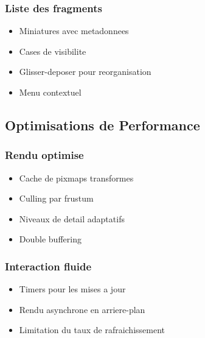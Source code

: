 \documentclass[12pt,a4paper]{article}
\begin{document}
\subsubsection{Liste des fragments}
\begin{itemize}
\item Miniatures avec metadonnees
\item Cases de visibilite
\item Glisser-deposer pour reorganisation
\item Menu contextuel
\end{itemize}

\subsection{Optimisations de Performance}

\subsubsection{Rendu optimise}
\begin{itemize}
\item Cache de pixmaps transformes
\item Culling par frustum
\item Niveaux de detail adaptatifs
\item Double buffering
\end{itemize}

\subsubsection{Interaction fluide}
\begin{itemize}
\item Timers pour les mises a jour
\item Rendu asynchrone en arriere-plan
\item Limitation du taux de rafraichissement
\end{itemize}
\end{document}
